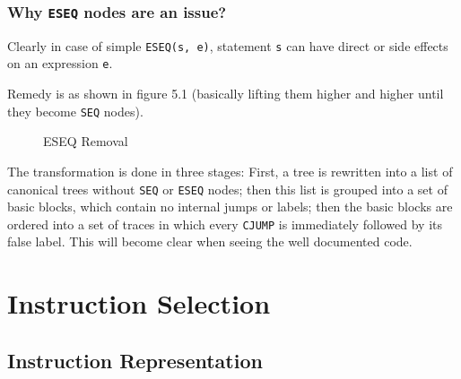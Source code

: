 \hypertarget{why-eseq-nodes-are-an-issue}{%
\subsubsection{\texorpdfstring{Why
\texttt{ESEQ}
nodes are an
issue?}{Why  nodes are an issue?}}\label{why-eseq-nodes-are-an-issue}}

Clearly in case of simple
\texttt{ESEQ(s, e)},
statement
\texttt{s} can
have direct or side effects on an expression
\texttt{e}.

Remedy is as shown in figure 5.1 (basically lifting them higher and
higher until they become
\texttt{SEQ}
nodes).

\begin{figure}
\centering
{}
\caption{ESEQ Removal}
\end{figure}

The transformation is done in three stages: First, a tree is rewritten
into a list of canonical trees without
\texttt{SEQ} or
\texttt{ESEQ}
nodes; then this list is grouped into a set of basic blocks, which
contain no internal jumps or labels; then the basic blocks are ordered
into a set of traces in which every
\texttt{CJUMP}
is immediately followed by its false label. This will become clear when
seeing the well documented code.

\section{Instruction Selection}


\hypertarget{instruction-representation}{%
\subsection{Instruction
Representation}\label{instruction-representation}}

